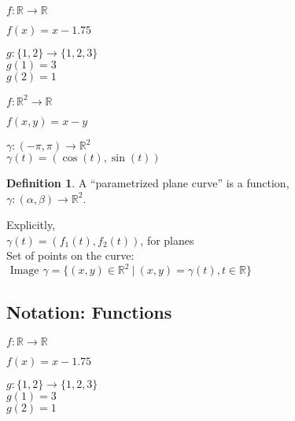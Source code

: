 \documentclass[twocolumn,20pt,fleqn]{extarticle}
\newcommand{\sep}{\vspace{0.5cm}}
\theoremstyle{plain}
\theoremstyle{definition}
\newtheorem*{definition}{Definition}
\theoremstyle{remark}
\begin{document}
$ f: \mathbb{R}  \to \mathbb{R}$

$f(x) = x - 1.75$\\

\sep

  $g : \{1,2\} \to \{1,2,3\}$\\
    $g(1) = 3$\\
    $g(2) = 1$\\

\sep

$ f: \mathbb{R}^2  \to \mathbb{R}$

$f(  x,y  ) = x - y$


\sep

$\gamma :  (-\pi,\pi)  \to \mathbb{R}^2$\\
$\gamma(t) = (\cos(t), \sin(t))$



\newpage



\begin{definition}
  A  ``parametrized plane curve''  is a  function,\\ $\gamma  : (\alpha, \beta) \to \mathbb{R}^2$.
\end{definition}

Explicitly,\\
$\gamma(t) = (f_1(t), f_2(t))$, for planes\\

Set of points on the curve:\\  $\textrm{ Image } \gamma = \{(x,y) \in \mathbb{R}^2 \ |\ (x,y) = \gamma(t), t \in \mathbb{R}\}$







\clearpage




\subsection{Notation: Functions}

$ f: \mathbb{R}  \to \mathbb{R}$

$f(x) = x - 1.75$\\

\sep

  $g : \{1,2\} \to \{1,2,3\}$\\
    $g(1) = 3$\\
    $g(2) = 1$\\

\sep
\end{document}

